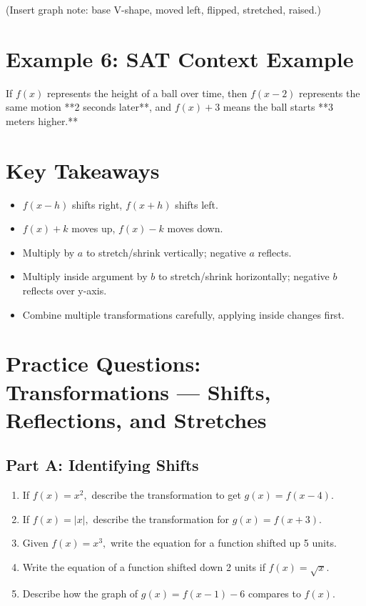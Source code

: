 \documentclass[12pt]{article}
\begin{document}
(Insert graph note: base V-shape, moved left, flipped, stretched, raised.)

\section*{Example 6: SAT Context Example}

If \(f(x)\) represents the height of a ball over time,  
then \(f(x - 2)\) represents the same motion **2 seconds later**,  
and \(f(x) + 3\) means the ball starts **3 meters higher.**

\section*{Key Takeaways}
\begin{itemize}
  \item \(f(x - h)\) shifts right, \(f(x + h)\) shifts left.
  \item \(f(x) + k\) moves up, \(f(x) - k\) moves down.
  \item Multiply by \(a\) to stretch/shrink vertically; negative \(a\) reflects.
  \item Multiply inside argument by \(b\) to stretch/shrink horizontally; negative \(b\) reflects over y-axis.
  \item Combine multiple transformations carefully, applying inside changes first.
\end{itemize}

\newpage


\section*{Practice Questions: Transformations — Shifts, Reflections, and Stretches}

\subsection*{Part A: Identifying Shifts}
\begin{enumerate}
  \item If \(f(x) = x^2,\) describe the transformation to get \(g(x) = f(x - 4).\)
  \item If \(f(x) = |x|,\) describe the transformation for \(g(x) = f(x + 3).\)
  \item Given \(f(x) = x^3,\) write the equation for a function shifted up 5 units.
  \item Write the equation of a function shifted down 2 units if \(f(x) = \sqrt{x}.\)
  \item Describe how the graph of \(g(x) = f(x - 1) - 6\) compares to \(f(x).\)
\end{enumerate}
\end{document}
